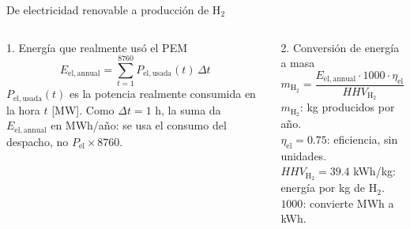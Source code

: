 \documentclass[aspectratio=169,11pt]{beamer}
\begin{document}
\begin{frame}{De electricidad renovable a producción de H$_2$}
  \begin{columns}[T,onlytextwidth]
      \begin{block}{1. Energía que realmente usó el PEM}
        \small
        \[
          E_{\mathrm{el,annual}}=
          \sum_{t=1}^{8760}P_{\mathrm{el,usada}}(t)\,\Delta t
        \]
        \footnotesize
        $P_{\mathrm{el,usada}}(t)$ es la potencia realmente consumida en la hora $t$ [MW]. Como $\Delta t=1$ h, la suma da $E_{\mathrm{el,annual}}$ en MWh/año: se usa el consumo del despacho, no $P_{\mathrm{el}}\times8760$.
      \end{block}

      \begin{exampleblock}{2. Conversión de energía a masa}
        \small
        \[
          m_{\mathrm{H_2}}=
          \frac{E_{\mathrm{el,annual}}\cdot1000\cdot\eta_{\mathrm{el}}}
          {HHV_{\mathrm{H_2}}}
        \]
        \footnotesize
        $m_{\mathrm{H_2}}$: kg producidos por año.\\
        $\eta_{\mathrm{el}}=0.75$: eficiencia, sin unidades.\\
        $HHV_{\mathrm{H_2}}=39.4$ kWh/kg: energía por kg de H$_2$.\\
        $1000$: convierte MWh a kWh.
      \end{exampleblock}
  \end{columns}

  
\end{frame}
\end{document}
